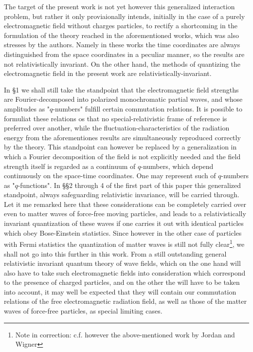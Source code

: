 \documentclass{article}
\begin{document}
The target of the present work is not yet however this generalized interaction problem, but rather it only proviaionally intends, initially in the case of a purely electromagnetic field without charges particles, to rectify a shortcoming in the formulation of the theory reached in the aforementioned works, which was also stresses by the authors. Namely in these works the time coordinates are always distinguished from the space coordinates in a peculiar manner, so the results are not relativistically invariant. On the other hand, the methods of quantizing the electromagnetic field in the present work are relativistically-invariant.

In §1 we shall still take the standpoint that the electromagnetic field strengths are Fourier-decomposed into polarized monochromatic partial waves, and whose amplitudes as "$q$-numbers" fulfill certain commutation relations. It is possible to formuliat these relations os that no special-relativistic frame of reference is preferred over another, while the fluctuation-characteristics of the radiation energy from the aforementiones results are simultaneously reproduced correctly by the theory. This standpoint can however be replaced by a generalization in which a Fourier decomposition of the field is not explicitly needed and the field strength itself is regarded as a continuum of $q$-numbers, which depend continuously on the space-time coordinates. One may represent such  of $q$-numbers as "$q$-functions". In §§2 through 4 of the first part of this paper this generalized standpoint, always safeguarding relativistic invariance, will be carried through. Let it me remarked here that these considerations can be completely carried over even to matter waves of force-free moving particles, and leads to a relativistically invariant quantization of these waves if one carries it out with identical particles which obey Bose-Einstein statistics. Since however in the other case of particles with Fermi statistics the quantization of matter waves is still not fully clear\footnote{Note in correction: c.f. however the above-mentioned work by Jordan and Wigner}, we shall not go into this further in this work. From a still outstanding general relativistic invariant quantum theory of wave fields, which on the one hand will also have to take such electromagnetic fields into consideration which correspond to the presence of charged particles, and on the other the  will have to be taken into account, it may well be expected that they will contain our commutation relations of the free electromagnetic radiation field, as well as those of the matter waves of force-free particles, as special limiting cases.
\end{document}
